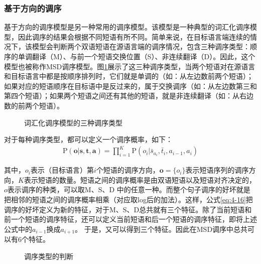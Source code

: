 
\subsubsection{基于方向的调序}

\parinterval 基于方向的调序模型是另一种常用的调序模型。该模型是一种典型的词汇化调序模型，因此调序的结果会根据不同短语有所不同。简单来说，在目标语言端连续的情况下，该模型会判断两个双语短语在源语言端的调序情况，包含三种调序类型：顺序的单调翻译（M）、与前一个短语交换位置（S）、非连续翻译（D）。因此，这个模型也被称作MSD调序模型\cite{Gros2008MSD}。图\ref{fig:4-21}展示了这三种调序类型，当两个短语对在源语言和目标语言中都是按顺序排列时，它们就是单调的（如：从左边数前两个短语）；如果对应的短语顺序在目标语中是反过来的，属于交换调序（如：从左边数第三和第四个短语）；如果两个短语之间还有其他的短语，就是非连续翻译（如：从右边数的前两个短语）。

\begin{figure}[htp]
\centering

\caption{词汇化调序模型的三种调序类型}
\label{fig:4-21}
\end{figure}

\parinterval 对于每种调序类型，都可以定义一个调序概率，如下：
\begin{eqnarray}
\textrm{P}(\mathbf{o}|\mathbf{s},\mathbf{t},\mathbf{a}) = \prod_{i=1}^{K} \textrm{P}(o_i| \bar{s}_{a_i}, \bar{t}_i, a_{i-1}, a_i)
\label{eq:4-16}
\end{eqnarray}

\noindent 其中，$o_i$表示（目标语言）第$i$个短语的调序方向，$\mathbf{o}=\{o_i\}$表示短语序列的调序方向，$K$表示短语的数量。短语之间的调序概率是由双语短语以及短语对齐决定的，$o$表示调序的种类，可以取M、S、D 中的任意一种。而整个句子调序的好坏就是把相邻的短语之间的调序概率相乘（对应取log后的加法）。这样，公式\ref{eq:4-16}把调序的好坏定义为新的特征，对于M、S、D总共就有三个特征。除了当前短语和前一个短语的调序特征，还可以定义当前短语和后一个短语的调序特征，即将上述公式中的$a_{i-1}$换成$a_{i+1}$。 于是，又可以得到三个特征。因此在MSD调序中总共可以有6个特征。

\begin{figure}[htp]
\centering

\caption{调序类型的判断}
\label{fig:4-22}
\end{figure}


